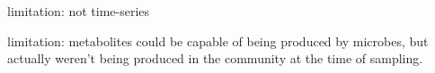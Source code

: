 \documentclass[11pt]{article}
\begin{document}
limitation: not time-series

limitation: metabolites could be capable of being produced by microbes, but actually weren't being produced in the community at the time of sampling.

\pagebreak
\footnotesize{

\par}
\end{document}
